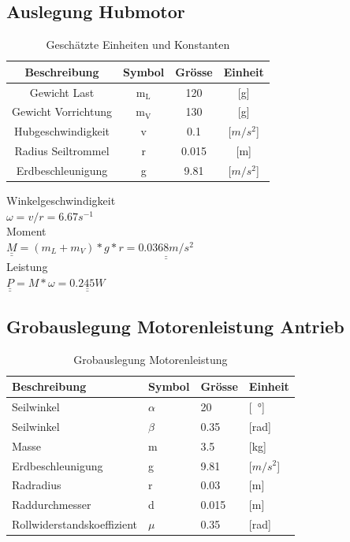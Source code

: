 \documentclass[a4paper]{report}
\begin{document}
\subsection{Auslegung Hubmotor}
\begin{table}[h!]
	\centering
	\begin{tabular}{|c|c|c|c|}
		\hline
		\textbf{Beschreibung}& \textbf{Symbol} & \textbf{Grösse} & \textbf{Einheit} \\
		\hline
		Gewicht Last& m$_{\text{L}}$ & 120 & [g] \\
		\hline
		Gewicht Vorrichtung& m$_{\text{V}}$ & 130 & [g] \\
		\hline
		Hubgeschwindigkeit& v & 0.1 & [$m/s^2$] \\
		\hline
		Radius Seiltrommel & r & 0.015 & [m]\\
		\hline
		Erdbeschleunigung & g & 9.81 & [$m/s^2$]\\
		\hline
	\end{tabular}
	\caption{Geschätzte Einheiten und Konstanten}
\end{table}
\noindent
Winkelgeschwindigkeit\\
$\omega=v/r=6.67s^{-1}$	\\
Moment\\
$\underline{\underline{M}}=(m_L+m_V)*g*r=\underline{\underline{0.0368m/s^2}}$\\
Leistung	\\
$\underline{\underline{P}}=M*\omega=\underline{\underline{0.245W}}$

\subsection{Grobauslegung Motorenleistung Antrieb}
\label{ssec:GrobMotor}
\begin{table}[h!]
	\begin{tabular}{|p{}|p{}|p{}|p{}|}
		\hline
		\textbf{Beschreibung} & \textbf{Symbol} & \textbf{Grösse}& \textbf{Einheit}  \\
		\hline
		Seilwinkel & $\alpha$ & 20 & [\SI{}{\degree}] \\
		\hline
		Seilwinkel & $\beta$ & 0.35 & [rad] \\
		\hline
		Masse & m & 3.5 & [kg] \\
		\hline
		Erdbeschleunigung & g & 9.81 & [$m/s^2$] \\
		\hline
		Radradius & r & 0.03 & [m] \\
		\hline
		Raddurchmesser & d & 0.015 & [m] \\
		\hline
		Rollwiderstandskoeffizient & $\mu$ & 0.35 & [rad] \\
		\hline
	\end{tabular}
	\caption{Grobauslegung Motorenleistung}
	\label{tbl:Motorenleistung}
\end{table}
\end{document}
